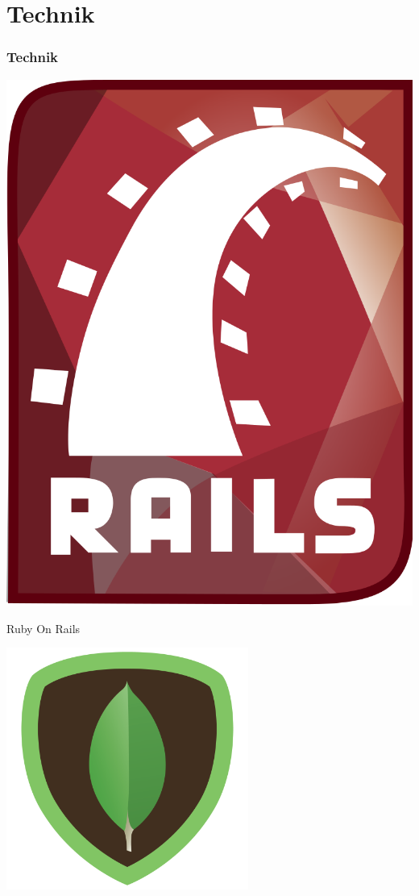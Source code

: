 \documentclass{beamer}
\begin{document}
\section{Technik}
\begin{frame}
  \frametitle{Technik}
  \begin{minipage}{.3\textwidth}
    \includegraphics[height=.3\textheight]{RubyOnRails}
  \end{minipage}%
  \hfill
  \begin{minipage}{.7\textwidth}
    Ruby On Rails \pause \\    
  \end{minipage}
  \begin{minipage}{.3\textwidth}
    \includegraphics[height=.3\textheight]{MongoDB}

\end{minipage}
\end{frame}
\end{document}

